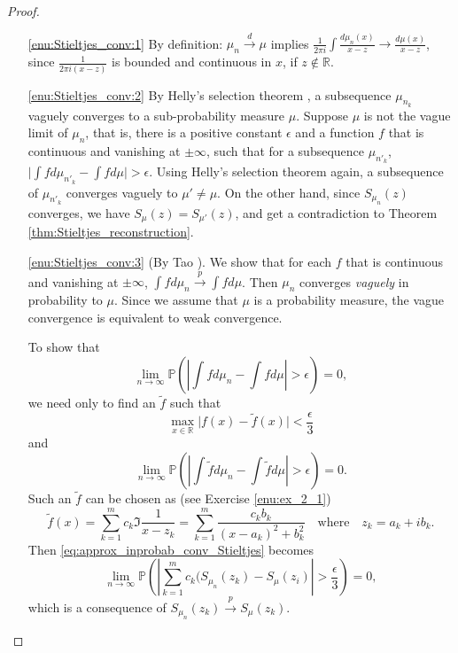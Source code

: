 \documentclass[11pt, a4paper]{article}
\numberwithin{equation}{section}
\newcommand{\realR}{\mathbb{R}}
\newcommand{\todistr}{\stackrel{d}{\rightarrow}}
\newcommand{\toprobab}{\stackrel{p}{\rightarrow}}
\newcommand{\Prob}{\mathbb{P}}
\theoremstyle{definition}
\theoremstyle{remark}
\begin{document}
\begin{proof}
  \begin{itemize}
  \item[\ref{enu:Stieltjes_conv:1}]
    By definition: $\mu_n \todistr \mu$ implies $\frac{1}{2\pi i} \int \frac{d\mu_n(x)}{x - z} \to \frac{d\mu(x)}{x - z}$, since $\frac{1}{2\pi i (x - z)}$ is bounded and continuous in $x$, if $z \notin \realR$.
  \item[\ref{enu:Stieltjes_conv:2}]
    By Helly's selection theorem \cite[Section 4.3]{Chung01}, a subsequence $\mu_{n_k}$ vaguely converges to a sub-probability measure $\mu$. Suppose $\mu$ is not the vague limit of $\mu_n$, that is, there is a positive constant $\epsilon$ and a function $f$ that is continuous and vanishing at $\pm \infty$, such that for a subsequence $\mu_{n'_k}$, $\lvert \int f d\mu_{n'_k} - \int f d\mu \rvert > \epsilon$. Using Helly's selection theorem again, a subsequence of $\mu_{n'_k}$ converges vaguely to $\mu' \neq \mu$. On the other hand, since $S_{\mu_n}(z)$ converges, we have $S_{\mu}(z) = S_{\mu'}(z)$, and get a contradiction to Theorem \ref{thm:Stieltjes_reconstruction}.
  \item[\ref{enu:Stieltjes_conv:3}] 
    (By Tao \cite[Section 4.2]{Tao12}). We show that for each $f$ that is continuous and vanishing at $\pm \infty$, $\int f d\mu_n \toprobab \int f d\mu$. Then $\mu_n$ converges \emph{vaguely} in probability to $\mu$. Since we assume that $\mu$ is a probability measure, the vague convergence is equivalent to weak convergence.

    To show that
    \begin{equation}
      \lim_{n \to \infty} \Prob \left( \left\lvert \int f d\mu_n - \int f d\mu \right\rvert > \epsilon \right) = 0,
    \end{equation}
    we need only to find an $\tilde{f}$ such that
    \begin{equation} \label{eq:relation_between_f_tilde_f}
      \max_{x \in \realR} \lvert f(x) - \tilde{f}(x) \rvert < \frac{\epsilon}{3}
    \end{equation}
    and 
    \begin{equation} \label{eq:approx_inprobab_conv_Stieltjes}
      \lim_{n \to \infty} \Prob \left( \left\lvert \int \tilde{f} d\mu_n - \int \tilde{f} d\mu \right\rvert > \epsilon \right) = 0.
    \end{equation}
    Such an $\tilde{f}$ can be chosen as (see Exercise \ref{enu:ex_2_1})
    \begin{equation} \label{eq:form_of_tilde_f}
      \tilde{f}(x) = \sum^m_{k = 1} c_k \Im \frac{1}{x - z_k} = \sum^m_{k = 1} \frac{c_k b_k}{(x - a_k)^2 + b^2_k} \quad \text{where} \quad z_k = a_k + i b_k.
    \end{equation}
    Then \eqref{eq:approx_inprobab_conv_Stieltjes} becomes
    \begin{equation}
      \lim_{n \to \infty} \Prob \left( \left\lvert \sum^m_{k = 1} c_k (S_{\mu_n}(z_k) - S_{\mu}(z_i) \right\rvert > \frac{\epsilon}{3} \right) = 0,
    \end{equation}
    which is a consequence of $S_{\mu_n}(z_k) \toprobab S_{\mu}(z_k)$.
  \end{itemize}
\end{proof}
\end{document}
